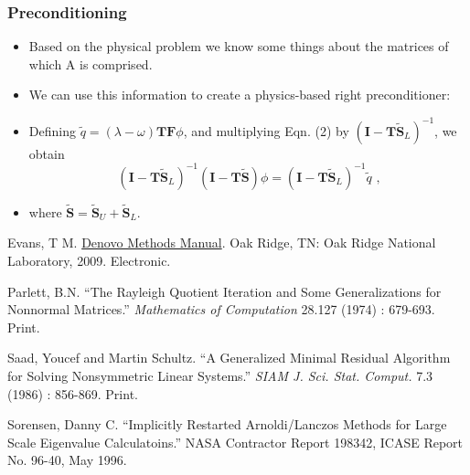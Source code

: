 \documentclass{beamer}
\begin{document}
\begin{frame}
  \frametitle{Preconditioning}
  
  \begin{itemize}
    \item Based on the physical problem we know some things about the matrices of which A is comprised.\\
    \item We can use this information to create a physics-based right preconditioner: \\
    \item Defining $\tilde{q} = (\lambda - \omega) \mathbf{TF}\phi$, and multiplying Eqn. (2) by $(\mathbf{I} - \mathbf{T\tilde{S}}_{L})^{-1}$, we obtain
    \begin{equation}
      (\mathbf{I} -\mathbf{T\tilde{S}}_{L})^{-1} (\mathbf{I} -\mathbf{T\tilde{S}}) \phi = (\mathbf{I} - \mathbf{T\tilde{S}}_{L})^{-1} \tilde{q} \text{ ,}
    \end{equation}
   \item where $\mathbf{\tilde{S}} = \mathbf{\tilde{S}}_{U} + \mathbf{\tilde{S}}_{L}$.
\end{itemize}
  
\end{frame}  
  
\begin{frame}
 \begin{thebibliography}{4}

  Evans, T M. \underline{Denovo Methods Manual}. Oak Ridge, TN: Oak Ridge National Laboratory, 2009. Electronic. 

  Parlett, B.N. ``The Rayleigh Quotient Iteration and Some Generalizations for Nonnormal Matrices.'' \emph{Mathematics of Computation} 28.127 (1974) : 679-693. Print. 
 
  Saad, Youcef and Martin Schultz. ``A Generalized Minimal Residual Algorithm for Solving Nonsymmetric Linear Systems.'' \emph{SIAM J. Sci. Stat. Comput.} 7.3 (1986) : 856-869. Print.
 
  Sorensen, Danny C. ``Implicitly Restarted Arnoldi/Lanczos Methods for Large Scale Eigenvalue Calculatoins.'' NASA Contractor Report 198342, ICASE Report No. 96-40, May 1996.

\end{thebibliography}
\end{frame}
\end{document}
